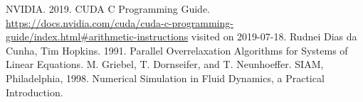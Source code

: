 \documentclass{article}%
\begin{document}
\begin{thebibliography}{999}

NVIDIA. 2019. CUDA C Programming Guide. \url{https://docs.nvidia.com/cuda/cuda-c-programming-guide/index.html#arithmetic-instructions} visited on 2019-07-18.
Rudnei Dias da Cunha, Tim Hopkins. 1991. Parallel Overrelaxation Algorithms for Systems of Linear Equations.
M. Griebel, T. Dornseifer, and T. Neunhoeffer. SIAM, Philadelphia, 1998. Numerical Simulation in Fluid Dynamics, a Practical Introduction.
\end{thebibliography}
\end{document}
